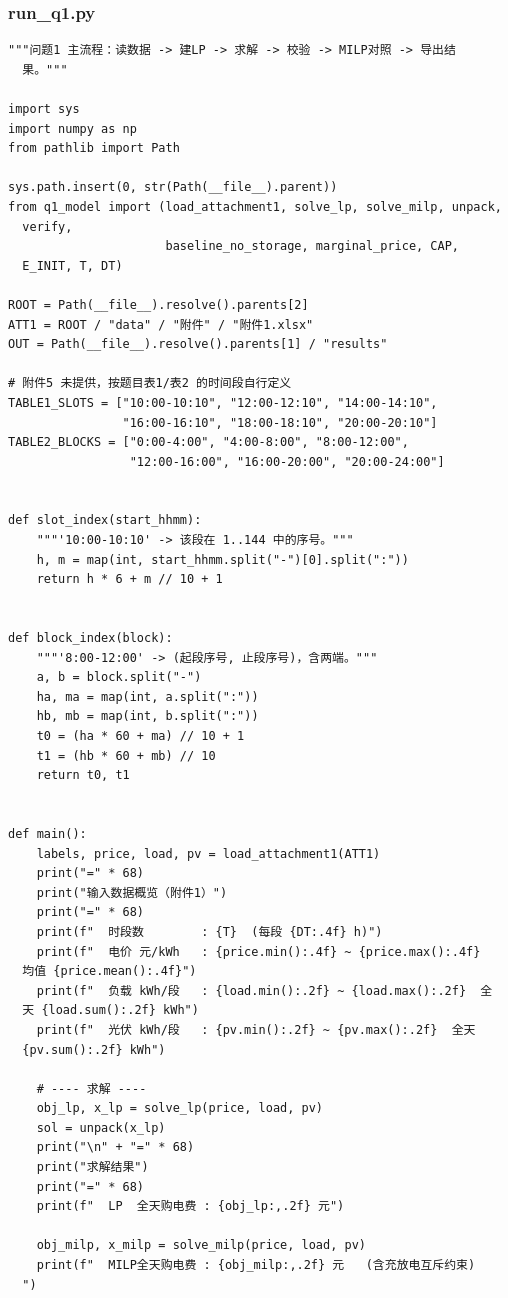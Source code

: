 \subsubsection*{run\_q1.py}
\begin{verbatim}
"""问题1 主流程：读数据 -> 建LP -> 求解 -> 校验 -> MILP对照 -> 导出结
  果。"""

import sys
import numpy as np
from pathlib import Path

sys.path.insert(0, str(Path(__file__).parent))
from q1_model import (load_attachment1, solve_lp, solve_milp, unpack,
  verify,
                      baseline_no_storage, marginal_price, CAP,
  E_INIT, T, DT)

ROOT = Path(__file__).resolve().parents[2]
ATT1 = ROOT / "data" / "附件" / "附件1.xlsx"
OUT = Path(__file__).resolve().parents[1] / "results"

# 附件5 未提供，按题目表1/表2 的时间段自行定义
TABLE1_SLOTS = ["10:00-10:10", "12:00-12:10", "14:00-14:10",
                "16:00-16:10", "18:00-18:10", "20:00-20:10"]
TABLE2_BLOCKS = ["0:00-4:00", "4:00-8:00", "8:00-12:00",
                 "12:00-16:00", "16:00-20:00", "20:00-24:00"]


def slot_index(start_hhmm):
    """'10:00-10:10' -> 该段在 1..144 中的序号。"""
    h, m = map(int, start_hhmm.split("-")[0].split(":"))
    return h * 6 + m // 10 + 1


def block_index(block):
    """'8:00-12:00' -> (起段序号, 止段序号)，含两端。"""
    a, b = block.split("-")
    ha, ma = map(int, a.split(":"))
    hb, mb = map(int, b.split(":"))
    t0 = (ha * 60 + ma) // 10 + 1
    t1 = (hb * 60 + mb) // 10
    return t0, t1


def main():
    labels, price, load, pv = load_attachment1(ATT1)
    print("=" * 68)
    print("输入数据概览（附件1）")
    print("=" * 68)
    print(f"  时段数        : {T}  (每段 {DT:.4f} h)")
    print(f"  电价 元/kWh   : {price.min():.4f} ~ {price.max():.4f}
  均值 {price.mean():.4f}")
    print(f"  负载 kWh/段   : {load.min():.2f} ~ {load.max():.2f}  全
  天 {load.sum():.2f} kWh")
    print(f"  光伏 kWh/段   : {pv.min():.2f} ~ {pv.max():.2f}  全天
  {pv.sum():.2f} kWh")

    # ---- 求解 ----
    obj_lp, x_lp = solve_lp(price, load, pv)
    sol = unpack(x_lp)
    print("\n" + "=" * 68)
    print("求解结果")
    print("=" * 68)
    print(f"  LP  全天购电费 : {obj_lp:,.2f} 元")

    obj_milp, x_milp = solve_milp(price, load, pv)
    print(f"  MILP全天购电费 : {obj_milp:,.2f} 元   (含充放电互斥约束)
  ")


\end{verbatim}
